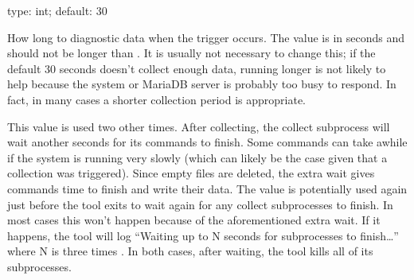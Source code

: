 \documentclass[letterpaper,10pt,english]{sphinxmanual}
\begin{document}
\begin{fulllineitems}
\label{\detokenize{mariadb-stat:cmdoption-mariadb-stat-run-time}}
type: int; default: 30

How long to {\hyperref[\detokenize{mariadb-stat:cmdoption-mariadb-stat-collect}]{}} diagnostic data when the trigger occurs.
The value is in seconds and should not be longer than {\hyperref[\detokenize{mariadb-stat:cmdoption-mariadb-stat-sleep}]{}}.  It is
usually not necessary to change this; if the default 30 seconds doesn’t
collect enough data, running longer is not likely to help because the system
or MariaDB server is probably too busy to respond.  In fact, in many cases a
shorter collection period is appropriate.

This value is used two other times.  After collecting, the collect subprocess
will wait another {\hyperref[\detokenize{mariadb-stat:cmdoption-mariadb-stat-run-time}]{}} seconds for its commands to finish.  Some
commands can take awhile if the system is running very slowly (which can
likely be the case given that a collection was triggered).  Since empty files
are deleted, the extra wait gives commands time to finish and write their
data.  The value is potentially used again just before the tool exits to wait
again for any collect subprocesses to finish.  In most cases this won’t
happen because of the aforementioned extra wait.  If it happens, the tool
will log “Waiting up to N seconds for subprocesses to finish…” where N is
three times {\hyperref[\detokenize{mariadb-stat:cmdoption-mariadb-stat-run-time}]{}}.  In both cases, after waiting, the tool kills
all of its subprocesses.

\end{fulllineitems}

\end{document}
